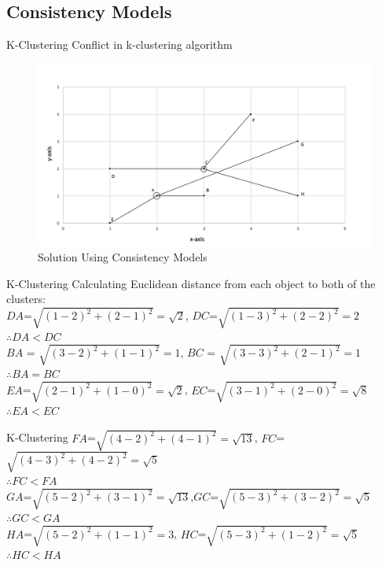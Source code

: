 \subsection{Consistency Models}
\begin{frame}{K-Clustering}
	Conflict in k-clustering algorithm
			\begin{figure}
			\includegraphics[width=0.8\linewidth]{figures/kcluster1.jpg}
			\caption{Solution Using Consistency Models}
			\end{figure}
\end{frame}

\begin{frame}{K-Clustering}
  Calculating Euclidean distance from each object to both of the clusters:\\
  $DA$=$\sqrt{{(1-2)}^2+{(2-1)}^2}=\sqrt{2}$,
  $DC$=$\sqrt{{(1-3)}^2+{(2-2)}^2}=2$\\
  $\therefore DA<DC$\\
  $BA$ = $\sqrt{{(3-2)}^2+{(1-1)}^2}=1$,
  $BC$ = $\sqrt{{(3-3)}^2+{(2-1)}^2}=1$\\
  $\therefore BA=BC$\\
  $EA$=$\sqrt{{(2-1)}^2+{(1-0)}^2}=\sqrt{2}$,
  $EC$=$\sqrt{{(3-1)}^2+{(2-0)}^2}=\sqrt{8}$\\
  $\therefore EA<EC$\\
\end{frame}

\begin{frame}{K-Clustering}
  $FA$=$\sqrt{{(4-2)}^2+{(4-1)}^2}=\sqrt{13}$,
  $FC$=$\sqrt{{(4-3)}^2+{(4-2)}^2}=\sqrt{5}$\\
  $\therefore FC<FA$\\
  $GA$=$\sqrt{{(5-2)}^2+{(3-1)}^2}=\sqrt{13}$,$GC$=$\sqrt{{(5-3)}^2+{(3-2)}^2}=\sqrt{5}$\\
  $\therefore GC<GA$\\
  $HA$=$\sqrt{{(5-2)}^2+{(1-1)}^2}=3$,
  $HC$=$\sqrt{{(5-3)}^2+{(1-2)}^2}=\sqrt{5}$\\
  $\therefore HC<HA$\\
\end{frame}

